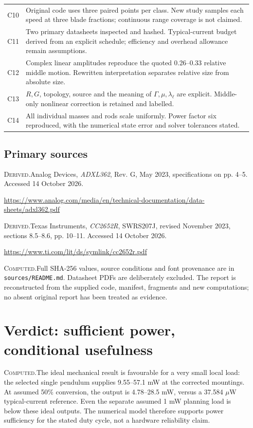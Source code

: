 \documentclass[10pt,a4paper]{article}
\newcommand{\D}{\textcolor{accent}{\textsc{Derived.}}\enspace}
\newcommand{\C}{\textcolor{accent}{\textsc{Computed.}}\enspace}
\newcommand{\page}[1]{\clearpage\section{#1}}
\begin{document}
\begin{tabularx}{\textwidth}{@{}lX@{}}
C10&Original code uses three paired points per class. New study samples each speed at three blade fractions; continuous range coverage is not claimed.\\
C11&Two primary datasheets inspected and hashed. Typical-current budget derived from an explicit schedule; efficiency and overhead allowance remain assumptions.\\
C12&Complex linear amplitudes reproduce the quoted 0.26--0.33 relative middle motion. Rewritten interpretation separates relative size from absolute size.\\
C13&$R,G$, topology, source and the meaning of $\Gamma,\mu,\lambda_\ell$ are explicit. Middle-only nonlinear correction is retained and labelled.\\
C14&All individual masses and rods scale uniformly. Power factor six reproduced, with the numerical state error and solver tolerances stated.\\\bottomrule
\end{tabularx}
\renewcommand{\arraystretch}{1}
\subsection*{Primary sources}
\D [1] Analog Devices, \emph{ADXL362}, Rev. G, May 2023, specifications on pp. 4--5. Accessed 14 October 2026.\par
\url{https://www.analog.com/media/en/technical-documentation/data-sheets/adxl362.pdf}

\D [2] Texas Instruments, \emph{CC2652R}, SWRS207J, revised November 2023, sections 8.5--8.6, pp. 10--11. Accessed 14 October 2026.\par
\url{https://www.ti.com/lit/ds/symlink/cc2652r.pdf}

\C Full SHA-256 values, source conditions and font provenance are in \texttt{sources/README.md}. Datasheet PDFs are deliberately excluded. The report is reconstructed from the supplied code, manifest, fragments and new computations; no absent original report has been treated as evidence.

\page{Verdict: sufficient power, conditional usefulness}
\C The ideal mechanical result is favourable for a very small local load: the selected single pendulum supplies 9.55--57.1 mW at the corrected mountings. At assumed 50\% conversion, the output is 4.78--28.5 mW, versus a 37.584 $\mu$W typical-current reference. Even the separate assumed 1 mW planning load is below these ideal outputs. The numerical model therefore supports power sufficiency for the stated duty cycle, not a hardware reliability claim.
\end{document}
